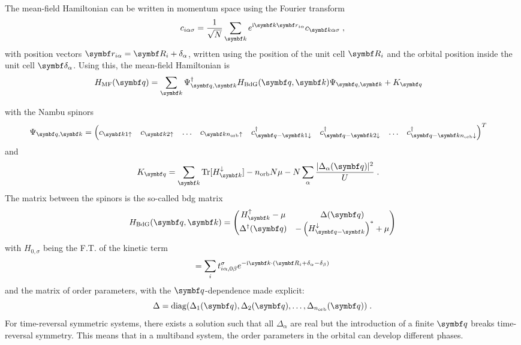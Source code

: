 \documentclass[../notes.tex]{subfiles}
\begin{document}
The mean-field Hamiltonian can be written in momentum space using the Fourier transform
\begin{equation}
	c_{i \alpha \sigma} = \frac{1}{\sqrt{N}} \sum_{\vb{k}} e^{\iu \vb{k} \vb{r}_{i \alpha}} c_{\vb{k} \alpha \sigma} \;,
\end{equation}
with position vectors \(\vb{r}_{i \alpha} = \vb{R}_i + \delta_{\alpha}\), written using the position of the unit cell \(\vb{R}_i\) and the orbital position inside the unit cell \(\vb{\delta}_{\alpha}\).
Using this, the mean-field Hamiltonian is
\begin{align}
	H_{\mathrm{MF}} (\vb{q}) &= \sum_{\vb{k}} \Psi_{\vb{q}, \vb{k}}^{\dagger} H_{\mathrm{BdG}} (\vb{q}, \vb{k}) \Psi_{\vb{q}, \vb{k}} + K_{\vb{q}}
\end{align}

with the Nambu spinors
\begin{align}
	\Psi_{\vb{q}, \vb{k}} &= 
		\begin{pmatrix}
			c_{\vb{k} 1 \uparrow} & 
			c_{\vb{k} 2 \uparrow} &
			\ldots &
			c_{\vb{k} n_{\mathrm{orb}} \uparrow} &
			c_{\vb{q} -\vb{k} 1 \downarrow}^{\dagger} &
			c_{\vb{q} -\vb{k} 2 \downarrow}^{\dagger} &
			\ldots &
			c_{\vb{q} -\vb{k} n_{\mathrm{orb}} \downarrow}^{\dagger}
		\end{pmatrix}^{T} \label{eq:Nambu spinor BCS theory}
\end{align}
and
\begin{align}
		K_{\vb{q}} &= \sum_{\vb{k}} \Tr [H_{\vb{k}}^{\downarrow}] - n_{\mathrm{orb}} N \mu - N \sum_{\alpha} \frac{\vert \Delta_{\alpha} (\vb{q}) \vert^2}{U} \;.
\end{align}
The matrix between the spinors is the so-called \acrfull{bdg} matrix
\begin{equation}
	H_{\mathrm{BdG}} (\vb{q}, \vb{k}) =
	\begin{pmatrix}
		H^{\uparrow}_{\vb{k}} - \mu & \Delta (\vb{q}) \\
		\Delta^{\dagger} (\vb{q}) & - \left(H^{\downarrow}_{\vb{q} - \vb{k}}\right)^* + \mu
	\end{pmatrix}
	\label{eq:BdG matrix}
\end{equation}
with \(H_{0, \sigma}\) being the F.T. of the kinetic term
\begin{equation}
	[H^{\sigma}_{\vb{k}}] = \sum_i t_{i \alpha, 0 \beta}^{\sigma} e^{-\iu \vb{k} \cdot (\vb{R}_i + \delta_{\alpha} - \delta_{\beta})}
\end{equation}
and the matrix of order parameters, with the \(\vb{q}\)-dependence made explicit:
\begin{equation}
	\Delta = \diag(\Delta_1 (\vb{q}), \Delta_2 (\vb{q}), \ldots, \Delta_{n_{\mathrm{orb}}} (\vb{q}))\;.
\end{equation}
For time-reversal symmetric systems, there exists a solution such that all \(\Delta_{\alpha}\) are real \cite{peottaSuperfluidityTopologicallyNontrivial2015} but the introduction of a finite \(\vb{q}\) breaks time-reversal symmetry.
This means that in a multiband system, the order parameters in the orbital can develop different phases.
\end{document}
